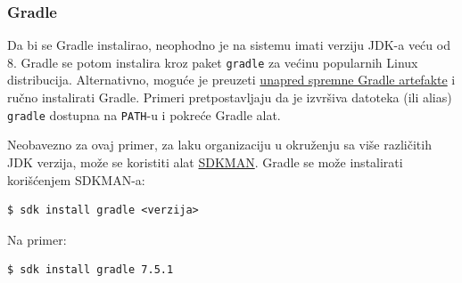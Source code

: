 \subsubsection{Gradle}\label{gradle}

Da bi se Gradle instalirao, neophodno je na sistemu imati verziju JDK-a veću od 8. Gradle se potom instalira kroz paket \texttt{gradle} za većinu popularnih Linux distribucija. Alternativno, moguće je preuzeti \href{https://gradle.org/releases}{unapred spremne Gradle artefakte} i ručno instalirati Gradle. Primeri pretpostavljaju da je izvršiva datoteka (ili alias) \texttt{gradle} dostupna na \texttt{PATH}-u i pokreće Gradle alat.

Neobavezno za ovaj primer, za laku organizaciju u okruženju sa više različitih JDK verzija, može se koristiti alat \href{https://sdkman.io/}{SDKMAN}. Gradle se može instalirati korišćenjem SDKMAN-a:

\begin{verbatim}
$ sdk install gradle <verzija>
\end{verbatim}

Na primer:

\begin{verbatim}
$ sdk install gradle 7.5.1
\end{verbatim}
